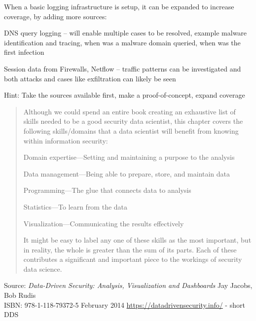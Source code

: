 \documentclass[Screen16to9,17pt]{foils}
\begin{document}
When a basic logging infrastructure is setup, it can be expanded to increase coverage, by
adding more sources:

\begin{list2}
\item DNS query logging -- will enable multiple cases to be resolved, example malware identification and tracing, when was a malware domain queried, when was the first infection
\item Session data from Firewalls, Netflow -- traffic patterns can be investigated and both attacks and cases like exfiltration can likely be seen
\end{list2}

Hint: Take the sources available first, make a proof-of-concept, expand coverage


\begin{quote}
Although we could spend an entire book creating an exhaustive list of skills needed to be a good security data scientist, this chapter covers the following skills/domains that a data scientist will benefit from
knowing within information security:
\begin{list2}
\item Domain expertise—Setting and maintaining a purpose to the analysis
\item Data management—Being able to prepare, store, and maintain data
\item Programming—The glue that connects data to analysis
\item Statistics—To learn from the data
\item Visualization—Communicating the results effectively
\end{list2}
It might be easy to label any one of these skills as the most important, but in reality, the whole is greater than the sum of its parts. Each of these contributes a significant and important piece to the workings of
security data science.
\end{quote}

Source: \emph{Data-Driven Security: Analysis, Visualization and Dashboards} Jay Jacobs, Bob Rudis\\
ISBN: 978-1-118-79372-5 February 2014 \url{https://datadrivensecurity.info/} - short DDS



\slidenext{}
\end{document}
